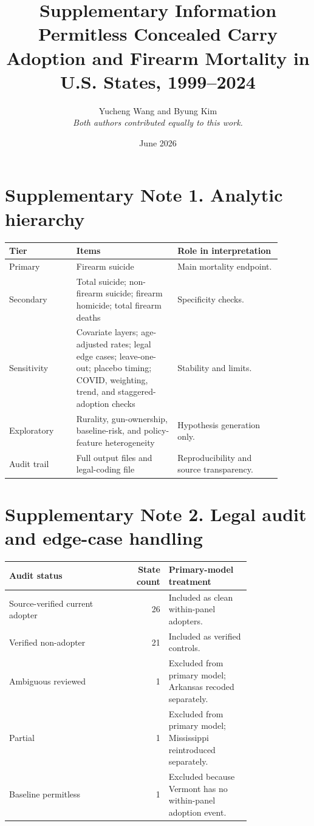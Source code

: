 \documentclass[10pt]{article}
\title{\bfseries Supplementary Information\\Permitless Concealed Carry Adoption and Firearm Mortality in U.S. States, 1999--2024}
\author{Yucheng Wang and Byung Kim\\\textit{Both authors contributed equally to this work.}}
\date{June 2026}
\begin{document}
\maketitle

\section*{Supplementary Note 1. Analytic hierarchy}


\begin{center}
\begin{tabular}{L{0.22\linewidth}L{0.33\linewidth}L{0.34\linewidth}}
\toprule
Tier & Items & Role in interpretation \\
\midrule
Primary & Firearm suicide & Main mortality endpoint. \\
Secondary & Total suicide; non-firearm suicide; firearm homicide; total firearm deaths & Specificity checks. \\
Sensitivity & Covariate layers; age-adjusted rates; legal edge cases; leave-one-out; placebo timing; COVID, weighting, trend, and staggered-adoption checks & Stability and limits. \\
Exploratory & Rurality, gun-ownership, baseline-risk, and policy-feature heterogeneity & Hypothesis generation only. \\
Audit trail & Full output files and legal-coding file & Reproducibility and source transparency. \\
\bottomrule
\end{tabular}
\end{center}

\section*{Supplementary Note 2. Legal audit and edge-case handling}


\begin{center}
\begin{tabular}{L{0.45\linewidth}rL{0.34\linewidth}}
\toprule
Audit status & State count & Primary-model treatment \\
\midrule
Source-verified current adopter & 26 & Included as clean within-panel adopters. \\
Verified non-adopter & 21 & Included as verified controls. \\
Ambiguous reviewed & 1 & Excluded from primary model; Arkansas recoded separately. \\
Partial & 1 & Excluded from primary model; Mississippi reintroduced separately. \\
Baseline permitless & 1 & Excluded because Vermont has no within-panel adoption event. \\
\bottomrule
\end{tabular}
\end{center}
\end{document}
